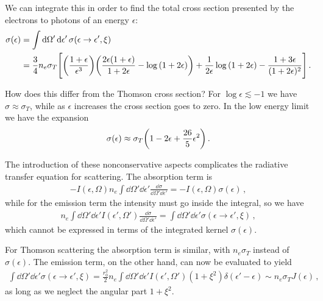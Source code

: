 \documentclass[main.tex]{subfiles}
\begin{document}
We can integrate this in order to find the total cross section presented by the electrons to photons of an energy \(\epsilon \): 
%
\begin{align}
\sigma (\epsilon ) &= \int \dd{\Omega '} \dd{\epsilon '} \sigma (\epsilon \to \epsilon ', \xi ) \\
&= \frac{3}{4} n_e \sigma_{T} \qty[ \qty(\frac{1 + \epsilon }{\epsilon^3}) 
\qty(\frac{2 \epsilon (1 + \epsilon )}{1 + 2 \epsilon }- \log \qty(1 + 2 \epsilon ))
+ 
\frac{1}{2 \epsilon } \log \qty(1 + 2 \epsilon )
- 
\frac{1 + 3 \epsilon }{(1 + 2 \epsilon )^2}
]
\,.
\end{align}

How does this differ from the Thomson cross section? For \(\log \epsilon \lesssim -1 \) we have \(\sigma \approx \sigma_T\), while as \(\epsilon \) increases the cross section goes to zero. 
In the low energy limit we have the expansion 
%
\begin{align}
\sigma (\epsilon )\approx \sigma_T \qty(1 -2 \epsilon + \frac{26}{5} \epsilon^2)
\,.
\end{align}

The introduction of these nonconservative aspects complicates the radiative transfer equation for scattering.
The absorption term is 
%
\begin{align}
- I (\epsilon , \Omega ) n_e \int \dd{\Omega }' \dd{\epsilon }' \frac{ \dd{\sigma }}{ \dd{\Omega }' \dd{\epsilon }' } =     - I (\epsilon , \Omega  ) \sigma (\epsilon )
\,,
\end{align}
%
while for the emission term the intensity must go inside the integral, so we have 
%
\begin{align}
n_e \int \dd{\Omega }' \dd{\epsilon '} I(\epsilon ', \Omega ') \frac{ \dd{\sigma }}{ \dd{\Omega }' \dd{\epsilon }' } = \int \dd{\Omega }' \dd{\epsilon }' \sigma (\epsilon \to \epsilon ', \xi )
\,,
\end{align}
%
which cannot be expressed in terms of the integrated kernel \(\sigma (\epsilon )\). 

For Thomson scattering the absorption term is similar, with \(n_e \sigma_T\) instead of \(\sigma (\epsilon )\). 
The emission term, on the other hand, can now be evaluated to yield  
%
\begin{align}
\int \dd{\Omega }' \dd{\epsilon }' \sigma (\epsilon \to \epsilon ', \xi )
= \frac{r_0^2}{2} n_e \int \dd{\Omega '} \dd{\epsilon '} I(\epsilon ', \Omega ') (1 + \xi^2) \delta (\epsilon ' - \epsilon ) \sim n_e \sigma_T J(\epsilon )
\,,
\end{align}
%
as long as we neglect the angular part \(1 + \xi^2\). 
\end{document}
